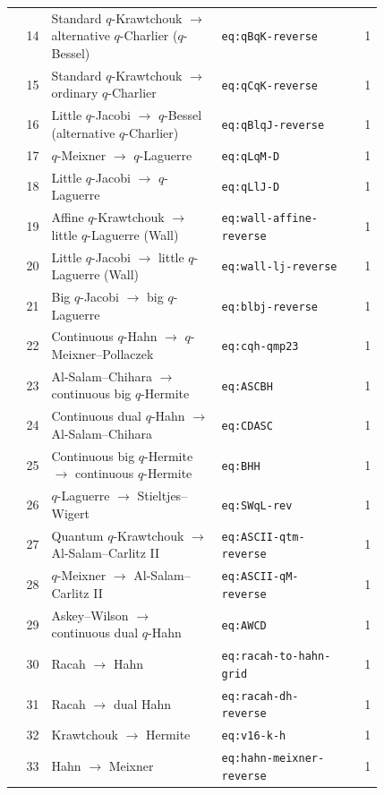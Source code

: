 \documentclass[10pt]{article}
\begin{document}
\begin{longtable}{@{}r p{0.46\linewidth} p{0.36\linewidth} r@{}}
14 & Standard $q$-Krawtchouk $\ensuremath{\to}$ alternative $q$-Charlier ($q$-Bessel) & \texttt{eq:qBqK-reverse} & 1 \\
15 & Standard $q$-Krawtchouk $\ensuremath{\to}$ ordinary $q$-Charlier & \texttt{eq:qCqK-reverse} & 1 \\
16 & Little $q$-Jacobi $\ensuremath{\to}$ $q$-Bessel (alternative $q$-Charlier) & \texttt{eq:qBlqJ-reverse} & 1 \\
17 & $q$-Meixner $\ensuremath{\to}$ $q$-Laguerre & \texttt{eq:qLqM-D} & 1 \\
18 & Little $q$-Jacobi $\ensuremath{\to}$ $q$-Laguerre & \texttt{eq:qLlJ-D} & 1 \\
19 & Affine $q$-Krawtchouk $\ensuremath{\to}$ little $q$-Laguerre (Wall) & \texttt{eq:wall-affine-reverse} & 1 \\
20 & Little $q$-Jacobi $\ensuremath{\to}$ little $q$-Laguerre (Wall) & \texttt{eq:wall-lj-reverse} & 1 \\
21 & Big $q$-Jacobi $\ensuremath{\to}$ big $q$-Laguerre & \texttt{eq:blbj-reverse} & 1 \\
22 & Continuous $q$-Hahn $\ensuremath{\to}$ $q$-Meixner--Pollaczek & \texttt{eq:cqh-qmp23} & 1 \\
23 & Al-Salam--Chihara $\ensuremath{\to}$ continuous big $q$-Hermite & \texttt{eq:ASCBH} & 1 \\
24 & Continuous dual $q$-Hahn $\ensuremath{\to}$ Al-Salam--Chihara & \texttt{eq:CDASC} & 1 \\
25 & Continuous big $q$-Hermite $\ensuremath{\to}$ continuous $q$-Hermite & \texttt{eq:BHH} & 1 \\
26 & $q$-Laguerre $\ensuremath{\to}$ Stieltjes--Wigert & \texttt{eq:SWqL-rev} & 1 \\
27 & Quantum $q$-Krawtchouk $\ensuremath{\to}$ Al-Salam--Carlitz II & \texttt{eq:ASCII-qtm-reverse} & 1 \\
28 & $q$-Meixner $\ensuremath{\to}$ Al-Salam--Carlitz II & \texttt{eq:ASCII-qM-reverse} & 1 \\
29 & Askey--Wilson $\ensuremath{\to}$ continuous dual $q$-Hahn & \texttt{eq:AWCD} & 1 \\
30 & Racah $\ensuremath{\to}$ Hahn & \texttt{eq:racah-to-hahn-grid} & 1 \\
31 & Racah $\ensuremath{\to}$ dual Hahn & \texttt{eq:racah-dh-reverse} & 1 \\
32 & Krawtchouk $\ensuremath{\to}$ Hermite & \texttt{eq:v16-k-h} & 1 \\
33 & Hahn $\ensuremath{\to}$ Meixner & \texttt{eq:hahn-meixner-reverse} & 1 \\

\end{longtable}
\end{document}
